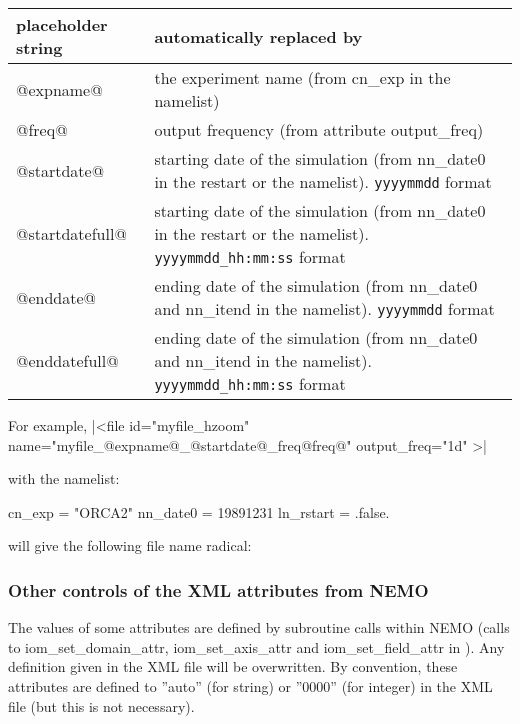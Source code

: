 \documentclass[../tex_main/NEMO_manual]{subfiles}
\begin{document}
\begin{table} \scriptsize
	\begin{tabularx}{\textwidth}{|lX|} \hline
		\centering placeholder string &
		automatically replaced by                          \\ \hline \hline
		\centering @expname@          &
		the experiment name (from cn\_exp in the namelist) \\ \hline
		\centering @freq@             &
		output frequency (from attribute output\_freq)     \\ \hline
		\centering @startdate@        &
		starting date of the simulation (from nn\_date0 in the restart or the namelist). \newline
		\verb?yyyymmdd?          format                   \\ \hline
		\centering @startdatefull@    &
		starting date of the simulation (from nn\_date0 in the restart or the namelist). \newline
		\verb?yyyymmdd_hh:mm:ss? format                    \\ \hline
		\centering @enddate@          &
		ending date of the simulation   (from nn\_date0 and nn\_itend  in the namelist). \newline
		\verb?yyyymmdd?          format                    \\ \hline
		\centering @enddatefull@      &
		ending date of the simulation   (from nn\_date0 and nn\_itend  in the namelist). \newline
		\verb?yyyymmdd_hh:mm:ss? format                    \\ \hline
	\end{tabularx}
\end{table}

\noindent For example, 
\xmlline|<file id="myfile_hzoom" name="myfile_@expname@_@startdate@_freq@freq@" output_freq="1d" >|

\noindent with the namelist:
\begin{forlines}
cn_exp    = "ORCA2"
nn_date0  = 19891231
ln_rstart = .false.
\end{forlines}

\noindent will give the following file name radical:

\subsubsection{Other controls of the XML attributes from NEMO}

The values of some attributes are defined by subroutine calls within NEMO 
(calls to iom\_set\_domain\_attr, iom\_set\_axis\_attr and iom\_set\_field\_attr in ). 
Any definition given in the XML file will be overwritten. 
By convention, these attributes are defined to ''auto'' (for string) or ''0000'' (for integer) in 
the XML file (but this is not necessary). \\
\end{document}
